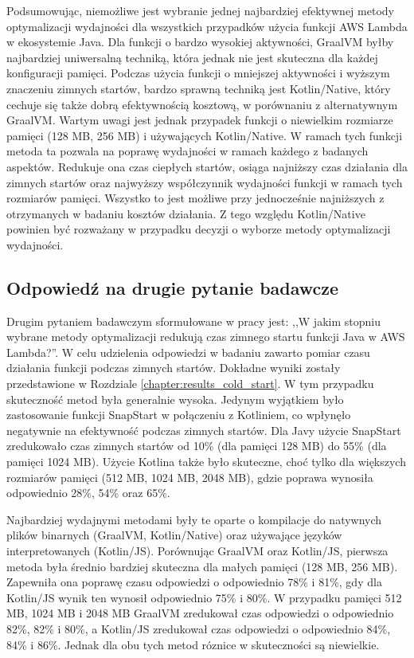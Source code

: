 Podsumowując, niemożliwe jest wybranie jednej najbardziej efektywnej metody optymalizacji wydajności dla wszystkich przypadków użycia funkcji AWS Lambda w ekosystemie Java.
Dla funkcji o bardzo wysokiej aktywności, GraalVM byłby najbardziej uniwersalną techniką, która jednak nie jest skuteczna dla każdej konfiguracji pamięci.
Podczas użycia funkcji o mniejszej aktywności i wyższym znaczeniu zimnych startów, bardzo sprawną techniką jest Kotlin/Native, który cechuje się także dobrą efektywnością kosztową, w porównaniu z alternatywnym GraalVM.
Wartym uwagi jest jednak przypadek funkcji o niewielkim rozmiarze pamięci (128 MB, 256 MB) i używających Kotlin/Native.
W ramach tych funkcji metoda ta pozwala na poprawę wydajności w ramach każdego z badanych aspektów.
Redukuje ona czas ciepłych startów, osiąga najniższy czas działania dla zimnych startów oraz najwyższy współczynnik wydajności funkcji w ramach tych rozmiarów pamięci.
Wszystko to jest możliwe przy jednocześnie najniższych z otrzymanych w badaniu kosztów działania.
Z tego względu Kotlin/Native powinien być rozważany w przypadku decyzji o wyborze metody optymalizacji wydajności.

\subsection*{Odpowiedź na drugie pytanie badawcze}

Drugim pytaniem badawczym sformułowane w pracy jest: ,,W jakim stopniu wybrane metody optymalizacji redukują czas zimnego startu funkcji Java w AWS Lambda?''.
W celu udzielenia odpowiedzi w badaniu zawarto pomiar czasu działania funkcji podczas zimnych startów.
Dokładne wyniki zostały przedstawione w Rozdziale \ref{chapter:results_cold_start}.
W tym przypadku skuteczność metod była generalnie wysoka.
Jedynym wyjątkiem było zastosowanie funkcji SnapStart w połączeniu z Kotliniem, co wpłynęło negatywnie na efektywność podczas zimnych startów.
Dla Javy użycie SnapStart zredukowało czas zimnych startów od 10\% (dla pamięci 128 MB) do 55\% (dla pamięci 1024 MB).
Użycie Kotlina także było skuteczne, choć tylko dla większych rozmiarów pamięci (512 MB, 1024 MB, 2048 MB), gdzie poprawa wynosiła odpowiednio 28\%, 54\% oraz 65\%.

Najbardziej wydajnymi metodami były te oparte o kompilacje do natywnych plików binarnych (GraalVM, Kotlin/Native) oraz używające języków interpretowanych (Kotlin/JS).
Porównując GraalVM oraz Kotlin/JS, pierwsza metoda była średnio bardziej skuteczna dla małych pamięci (128 MB, 256 MB).
Zapewniła ona poprawę czasu odpowiedzi o odpowiednio 78\% i 81\%, gdy dla Kotlin/JS wynik ten wynosił odpowiednio 75\% i 80\%.
W przypadku pamięci 512 MB, 1024 MB i 2048 MB GraalVM zredukował czas odpowiedzi o odpowiednio 82\%, 82\% i 80\%, a Kotlin/JS zredukował czas odpowiedzi o odpowiednio 84\%, 84\% i 86\%.  
Jednak dla obu tych metod róznice w skuteczności są niewielkie. 

